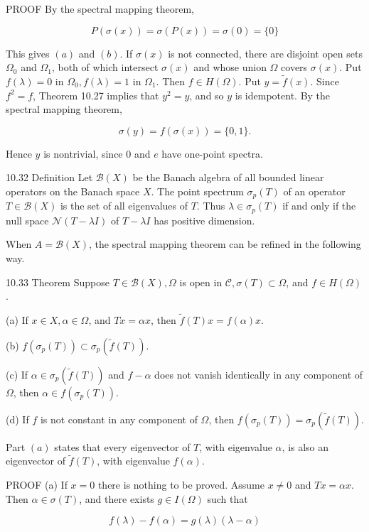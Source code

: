 \documentclass[10pt]{article}
\begin{document}
PROOF By the spectral mapping theorem,

$$
P(\sigma(x))=\sigma(P(x))=\sigma(0)=\{0\}
$$

This gives $(a)$ and $(b)$. If $\sigma(x)$ is not connected, there are disjoint open sets $\Omega_{0}$ and $\Omega_{1}$, both of which intersect $\sigma(x)$ and whose union $\Omega$ covers $\sigma(x)$. Put $f(\lambda)=0$ in $\Omega_{0}, f(\lambda)=1$ in $\Omega_{1}$. Then $f \in H(\Omega)$. Put $y=\tilde{f}(x)$. Since $f^{2}=f$, Theorem 10.27 implies that $y^{2}=y$, and so $y$ is idempotent. By the spectral mapping theorem,

$$
\sigma(y)=f(\sigma(x))=\{0,1\} .
$$

Hence $y$ is nontrivial, since 0 and $e$ have one-point spectra.

10.32 Definition Let $\mathscr{B}(X)$ be the Banach algebra of all bounded linear operators on the Banach space $X$. The point spectrum $\sigma_{p}(T)$ of an operator $T \in \mathscr{B}(X)$ is the set of all eigenvalues of $T$. Thus $\lambda \in \sigma_{p}(T)$ if and only if the null space $\mathcal{N}(T-\lambda I)$ of $T-\lambda I$ has positive dimension.

When $A=\mathscr{B}(X)$, the spectral mapping theorem can be refined in the following way.

10.33 Theorem Suppose $T \in \mathscr{B}(X), \Omega$ is open in $\mathscr{C}, \sigma(T) \subset \Omega$, and $f \in H(\Omega)$.

(a) If $x \in X, \alpha \in \Omega$, and $T x=\alpha x$, then $\tilde{f}(T) x=f(\alpha) x$.

(b) $f\left(\sigma_{p}(T)\right) \subset \sigma_{p}(\tilde{f}(T))$.

(c) If $\alpha \in \sigma_{p}(\tilde{f}(T))$ and $f-\alpha$ does not vanish identically in any component of $\Omega$, then $\alpha \in f\left(\sigma_{p}(T)\right)$.

(d) If $f$ is not constant in any component of $\Omega$, then $f\left(\sigma_{p}(T)\right)=\sigma_{p}(\tilde{f}(T))$.

Part $(a)$ states that every eigenvector of $T$, with eigenvalue $\alpha$, is also an eigenvector of $\tilde{f}(T)$, with eigenvalue $f(\alpha)$.

PROOF (a) If $x=0$ there is nothing to be proved. Assume $x \neq 0$ and $T x=\alpha x$. Then $\alpha \in \sigma(T)$, and there exists $g \in I(\Omega)$ such that

$$
f(\lambda)-f(\alpha)=g(\lambda)(\lambda-\alpha)
$$
\end{document}
